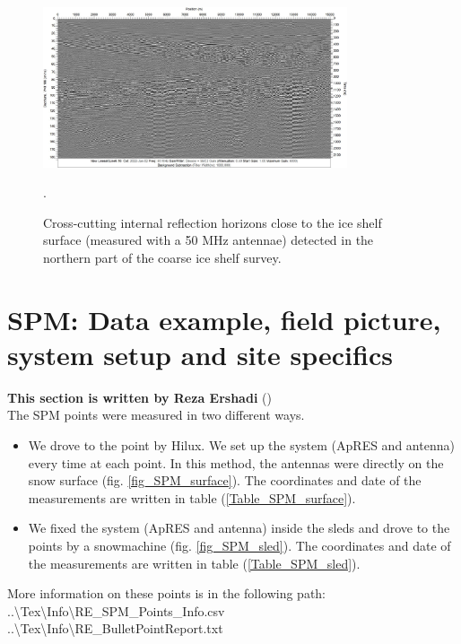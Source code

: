 \documentclass[a4paper,12pt]{article}
\begin{document}
\begin{figure}[H]
\includegraphics[width=0.8\textwidth]{Figures/PulseEkko/Line6-16-greyr.jpg}
\caption{Cross-cutting internal reflection horizons close to the ice shelf surface (measured with a 50 MHz antennae) detected in the northern part of the coarse ice shelf survey.}.
\label{fig_IRH2}
\end{figure}
\pagebreak
\section{SPM: Data example, field picture, system setup and site specifics}
\label{SecSPM}
\textbf{This section is written by Reza Ershadi}
(\href{mailto:mohammadreza.ershadi@uni-tuebingen.de}{\color{blue}{Email Me}})\\

The SPM points were measured in two different ways.
\begin{itemize}
\item We drove to the point by
Hilux. We set up the system (ApRES and antenna) every time at each point. In
this method, the antennas were directly on the snow surface (fig. \ref{fig_SPM_surface}). The
coordinates and date of the measurements are written in table (\ref{Table_SPM_surface}).
\item We fixed the system (ApRES and antenna) inside the sleds and drove to the points by a
snowmachine (fig. \ref{fig_SPM_sled}). The coordinates and date of the measurements are written in
table (\ref{Table_SPM_sled}).
\end{itemize}
More information on these points is in the following path:\\
..\textbackslash Tex\textbackslash Info\textbackslash RE\_SPM\_Points\_Info.csv\\
..\textbackslash Tex\textbackslash Info\textbackslash RE\_BulletPointReport.txt
\end{document}
